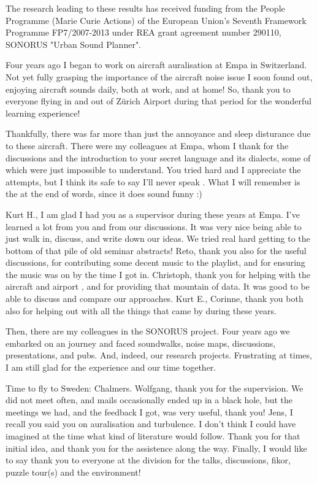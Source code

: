 The research leading to these results has received funding from
the People Programme (Marie Curie Actions) of the European Union's Seventh
Framework Programme FP7/2007-2013 under REA grant agreement number 290110,
SONORUS "Urban Sound Planner".

Four years ago I began to work on aircraft auralisation at Empa in Switzerland.
Not yet fully grasping the importance of the aircraft noise issue I soon found
out, enjoying aircraft sounds daily, both
at work, and at home! So, thank you to everyone flying in and out of Z\"{u}rich
Airport during that period for the wonderful learning experience!

Thankfully, there was far more than just the annoyance and sleep disturance due to
these aircraft. There were my colleagues at Empa, whom I thank for the
discussions and the introduction to your secret language and its
dialects, some of which were just impossible to understand. You
tried hard and I appreciate the attempts, but I think its safe to say I'll never
speak . What I will remember is the  at the end of
words, since it does sound funny :)

Kurt H., I am glad I had you as a supervisor during these years at Empa. I've
learned a lot from you and from our discussions. It was very nice being able to
just walk in, discuss, and write down our ideas. We tried real hard getting to
the bottom of that pile of old seminar abstracts! Reto, thank you also for the
useful discussions, for contributing some decent music to the playlist, and for
ensuring the music was on by the time I got in. Christoph, thank you for helping
with the aircraft and airport , and for providing that mountain of
data. It was good to be able to discuss and compare our approaches. Kurt E.,
Corinne, thank you both also for helping out with all the things that came by
during these years.

Then, there are my colleagues in the SONORUS project. Four years ago we embarked
on an  journey and faced soundwalks, noise maps,
discussions, presentations, and pubs. And, indeed, our research projects.
Frustrating at times, I am still glad for the experience and our time together.

Time to fly to Sweden: Chalmers. Wolfgang, thank you for the supervision. We did
not meet often, and mails occasionally ended up in a black hole, but the meetings we
had, and the feedback I got, was very useful, thank you! Jens, I recall you said
you  on auralisation and turbulence. I don't think I could have
imagined at the time what kind of literature would follow. Thank you for that
initial idea, and thank you for the assistence along the way. Finally, I would
like to say thank you to everyone at the division for the talks, discussions,
fikor, puzzle tour(s) and the  environment!


%
%
%
